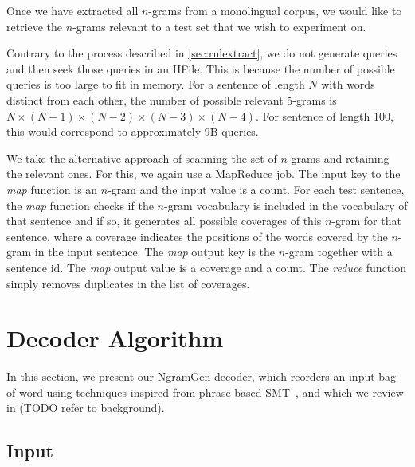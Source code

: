 Once we have extracted all $n$-grams from a monolingual corpus, we
would like to retrieve the $n$-grams relevant to a test set
that we wish to experiment on.

Contrary to the process described in \autoref{sec:rulextract}, we
do not generate queries and then seek those queries in an HFile.
This is because the number of possible queries is too large
to fit in memory. For a sentence of length $N$ with words distinct
from each other, the number of possible relevant 5-grams is
$N \times (N - 1) \times (N - 2) \times (N - 3) \times (N - 4)$.
For sentence of length 100, this would correspond to approximately
9B queries.

We take the alternative approach of scanning the set of $n$-grams
and retaining the relevant ones. For this, we again use a MapReduce
job. The input key to the \emph{map} function is an $n$-gram and
the input value is a count. For each test sentence, the \emph{map}
function checks if the $n$-gram vocabulary is included in the
vocabulary of that sentence and if so, it generates all possible
coverages of this $n$-gram for that sentence, where a coverage
indicates the positions of the words covered by the $n$-gram
in the input sentence. The \emph{map}
output key is the $n$-gram together with a sentence id. The \emph{map}
output value is a coverage and a count. The \emph{reduce} function
simply removes duplicates in the list of coverages. %

\section{Decoder Algorithm}
\label{sec:gyroDecoderAlgorithm}

In this section, we present our NgramGen decoder, which reorders
an input bag of word using techniques inspired from phrase-based
SMT~\citep{koehn:2010:book}, and which we review in (TODO refer to
background).

\subsection{Input}

